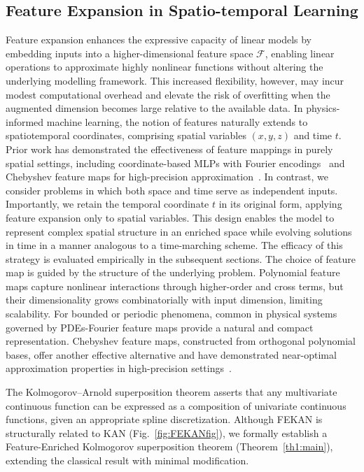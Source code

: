 \documentclass{article}
\begin{document}
\subsection{Feature Expansion in Spatio-temporal Learning}
Feature expansion enhances the expressive capacity of linear models by embedding inputs into a higher-dimensional feature space $\mathcal{F}$, enabling linear operations to approximate highly nonlinear functions without altering the underlying modelling framework. This increased flexibility, however, may incur modest computational overhead and elevate the risk of overfitting when the augmented dimension becomes large relative to the available data. In physics-informed machine learning, the notion of features naturally extends to spatiotemporal coordinates, comprising spatial variables $(x,y,z)$ and time $t$. Prior work has demonstrated the effectiveness of feature mappings in purely spatial settings, including coordinate-based MLPs with Fourier encodings~\cite{tancik2020fourier} and Chebyshev feature maps for high-precision approximation~\cite{xu2024chebyshev}. In contrast, we consider problems in which both space and time serve as independent inputs. Importantly, we retain the temporal coordinate $t$ in its original form, applying feature expansion only to spatial variables. This design enables the model to represent complex spatial structure in an enriched space while evolving solutions in time in a manner analogous to a time-marching scheme. The efficacy of this strategy is evaluated empirically in the subsequent sections. The choice of feature map is guided by the structure of the underlying problem. Polynomial feature maps capture nonlinear interactions through higher-order and cross terms, but their dimensionality grows combinatorially with input dimension, limiting scalability. For bounded or periodic phenomena, common in physical systems governed by PDEs-Fourier feature maps provide a natural and compact representation. Chebyshev feature maps, constructed from orthogonal polynomial bases, offer another effective alternative and have demonstrated near-optimal approximation properties in high-precision settings~\cite{xu2024chebyshev}.

The Kolmogorov–Arnold superposition theorem asserts that any multivariate continuous function can be expressed as a composition of univariate continuous functions, given an appropriate spline discretization. Although FEKAN is structurally related to KAN (Fig.~\ref{fig:FEKANfig}), we formally establish a Feature-Enriched Kolmogorov superposition theorem (Theorem~\ref{th1:main}), extending the classical result with minimal modification.
\end{document}

